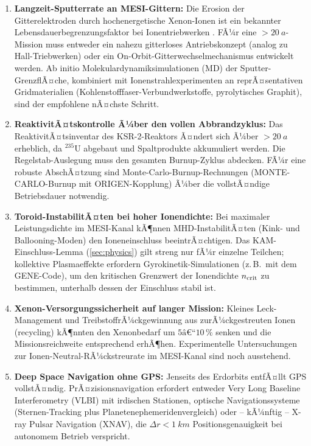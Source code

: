 ﻿\documentclass[a4paper,12pt,twoside]{article}
\theoremstyle{plain}
\theoremstyle{definition}
\theoremstyle{remark}
\begin{document}
	\begin{enumerate}
		\item \textbf{Langzeit-Sputterrate an MESI-Gittern:}
		Die Erosion der Gitterelektroden durch hochenergetische Xenon-Ionen ist
		ein bekannter Lebensdauerbegrenzungsfaktor bei Ionentriebwerken
		\cite{polk1999}. FÃ¼r eine $>\SI{20}{a}$-Mission muss entweder
		ein nahezu gitterloses Antriebskonzept (analog zu Hall-Triebwerken)
		oder ein On-Orbit-Gitterwechselmechanismus entwickelt werden.
		Ab initio Molekulardynamiksimulationen (MD) der Sputter-GrenzflÃ¤che,
		kombiniert mit Ionenstrahlexperimenten an reprÃ¤sentativen Gridmaterialien
		(Kohlenstofffaser-Verbundwerkstoffe, pyrolytisches Graphit), sind
		der empfohlene nÃ¤chste Schritt.

		\item \textbf{ReaktivitÃ¤tskontrolle Ã¼ber den vollen Abbrandzyklus:}
		Das ReaktivitÃ¤tsinventar des KSR-2-Reaktors Ã¤ndert sich Ã¼ber
		$>\SI{20}{a}$ erheblich, da $^{235}$U abgebaut und Spaltprodukte
		akkumuliert werden. Die Regelstab-Auslegung muss den gesamten
		Burnup-Zyklus abdecken. FÃ¼r eine robuste AbschÃ¤tzung sind
		Monte-Carlo-Burnup-Rechnungen (MONTE-CARLO-Burnup mit ORIGEN-Kopplung)
		Ã¼ber die vollstÃ¤ndige Betriebsdauer notwendig.

		\item \textbf{Toroid-InstabilitÃ¤ten bei hoher Ionendichte:}
		Bei maximaler Leistungsdichte im MESI-Kanal kÃ¶nnen MHD-InstabilitÃ¤ten
		(Kink- und Ballooning-Moden) den Ioneneinschluss beeintrÃ¤chtigen.
		Das KAM-Einschluss-Lemma (\cref{sec:physics}) gilt streng nur fÃ¼r
		einzelne Teilchen; kollektive Plasmaeffekte erfordern
		Gyrokinetik-Simulationen (z.\,B.\ mit dem GENE-Code), um den
		kritischen Grenzwert der Ionendichte $n_{\rm crit}$ zu bestimmen,
		unterhalb dessen der Einschluss stabil ist.

		\item \textbf{Xenon-Versorgungssicherheit auf langer Mission:}
		Kleines Leck-Management und TreibstoffrÃ¼ckgewinnung aus zurÃ¼ck\-gestreuten
		Ionen (recycling) kÃ¶nnten den Xenonbedarf um $5\text{â€“}10\,\%$ senken
		und die Missionsreichweite entsprechend erhÃ¶hen. Experimentelle
		Untersuchungen zur Ionen-Neutral-RÃ¼ckstreurate im MESI-Kanal sind
		noch ausstehend.

		\item \textbf{Deep Space Navigation ohne GPS:}
		Jenseits des Erdorbits entfÃ¤llt GPS vollstÃ¤ndig. PrÃ¤zisions\-navigation
		erfordert entweder Very Long Baseline Interferometry (VLBI) mit irdischen
		Stationen, optische Navigationssysteme (Sternen-Tracking plus
		Planetenephemeridenvergleich) oder -- kÃ¼nftig -- X-ray Pulsar Navigation
		(XNAV), die $\Delta r < \SI{1}{km}$ Positionsgenauigkeit bei autonomem
		Betrieb verspricht.
	\end{enumerate}
\end{document}
